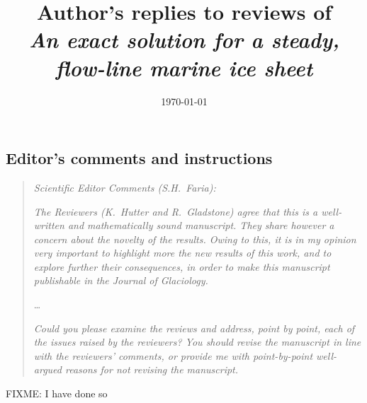 \documentclass[11pt,reqno]{amsart}
\title[Author's replies to reviews of \emph{An exact solution \dots}]{Author's replies to reviews of \\ \emph{An exact solution for a steady, flow-line marine ice sheet}}
\date{\today}
\begin{document}
\maketitle

\thispagestyle{empty}



\subsection*{Editor's comments and instructions}  \begin{quote}
\emph{Scientific Editor Comments (S.H.~Faria):}

\emph{The Reviewers (K.~Hutter and R.~Gladstone) agree that this is a well-written and mathematically sound manuscript. They share however a concern about the novelty of the results. Owing to this, it is in my opinion very important to highlight more the new results of this work, and to explore further their consequences, in order to make this manuscript publishable in the Journal of Glaciology.}

\dots

\emph{Could you please examine the reviews and address, point by point, each of the issues raised by the reviewers? You should revise the manuscript in line with the reviewers' comments, or provide me with point-by-point well-argued reasons for not revising the manuscript.}
\end{quote}

\noindent FIXME:  I have done so
\end{document}
